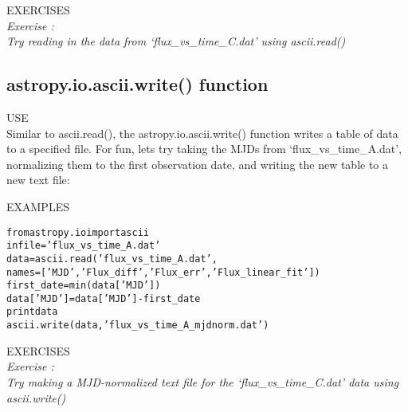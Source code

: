 {\color{blue} {\sf\small EXERCISES}} \\
{\it Exercise  :  \\
Try reading in the data from `flux\_vs\_time\_C.dat' using {\sf \small ascii.read()}}

\subsection{ {\sf astropy.io.ascii.write() } function}
{\color{blue} {\sf\small USE}} \\
Similar to {\sf\small ascii.read()}, the {\sf\small astropy.io.ascii.write()} function writes a table of data 
to a specified file.  For fun, lets try taking the MJDs from `flux\_vs\_time\_A.dat', 
normalizing them to the first observation date, and writing the new table to a new text file:

{\color{blue} {\sf\small EXAMPLES}} 
\begin{alltt}
\pytab from astropy.io import ascii
\pytab infile = 'flux_vs_time_A.dat'
\pytab data = ascii.read('flux_vs_time_A.dat', 
              names=['MJD', 'Flux_diff', 'Flux_err', 'Flux_linear_fit'])
\pytab first_date = min(data['MJD'])
\pytab data['MJD'] = data['MJD'] - first_date
\pytab print data
\pytab ascii.write(data, 'flux_vs_time_A_mjdnorm.dat')
\end{alltt}

{\color{blue} {\sf\small EXERCISES}} \\
{\it Exercise  :  \\
Try making a MJD-normalized text file for the `flux\_vs\_time\_C.dat' data using {\sf \small ascii.write()}}